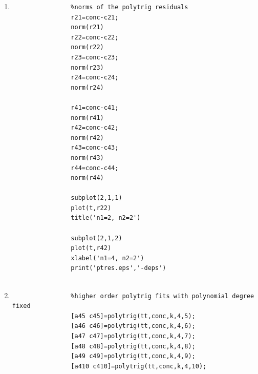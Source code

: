 \documentclass[11pt,a4paper]{article}
\begin{document}
\begin{enumerate}
\begin{enumerate}
\begin{enumerate}
\begin{verbatim}
				subplot(2,2,3)
				plot(t,conc)
				hold on
				plot(t,c13,'r')
				xlabel('n2=3')
				hold off

				subplot(2,2,4)
				plot(t,conc)
				hold on
				plot(t,c14,'r')
				xlabel('n2=4')
				hold off
				print('pt1.eps','-deps')

				subplot(2,2,1)
				plot(t,conc)
				hold on
				plot(t,c21,'r')
				title('n2=1')
				hold off

				subplot(2,2,2)
				plot(t,conc)
				hold on
				plot(t,c22,'r')
				title('n2=2')
				hold off

				subplot(2,2,3)
				plot(t,conc)
				hold on
				plot(t,c23,'r')
				xlabel('n2=3')
				hold off

				subplot(2,2,4)
				plot(t,conc)
				hold on
				plot(t,c24,'r')
				xlabel('n2=4')
				hold off
				print('pt2.eps','-deps')

				subplot(2,2,1)
				plot(t,conc)
				hold on
				plot(t,c41,'r')
				title('n2=1')
				hold off

				subplot(2,2,2)
				plot(t,conc)
				hold on
				plot(t,c42,'r')
				title('n2=2')
				hold off

				subplot(2,2,3)
				plot(t,conc)
				hold on
				plot(t,c43,'r')
				xlabel('n2=3')
				hold off


				subplot(2,2,4)
				plot(t,conc)
				hold on
				plot(t,c44,'r')
				xlabel('n2=4')
				hold off
				print('pt3.eps','-deps')
			\end{verbatim}
			
			\item[(ii)]
			\begin{verbatim}
				%norms of the polytrig residuals
				r21=conc-c21;
				norm(r21)
				r22=conc-c22;
				norm(r22)
				r23=conc-c23;
				norm(r23)
				r24=conc-c24;
				norm(r24)

				r41=conc-c41;
				norm(r41)
				r42=conc-c42;
				norm(r42)
				r43=conc-c43;
				norm(r43)
				r44=conc-c44;
				norm(r44)
				
				subplot(2,1,1)
				plot(t,r22)
				title('n1=2, n2=2')

				subplot(2,1,2)
				plot(t,r42)
				xlabel('n1=4, n2=2')
				print('ptres.eps','-deps')
				
			\end{verbatim}
			
			\item[(iii)]
			\begin{verbatim}
				%higher order polytrig fits with polynomial degree fixed
				[a45 c45]=polytrig(tt,conc,k,4,5);
				[a46 c46]=polytrig(tt,conc,k,4,6);
				[a47 c47]=polytrig(tt,conc,k,4,7);
				[a48 c48]=polytrig(tt,conc,k,4,8);
				[a49 c49]=polytrig(tt,conc,k,4,9);
				[a410 c410]=polytrig(tt,conc,k,4,10);
			

\end{verbatim}
\end{enumerate}
\end{enumerate}
\end{enumerate}
\end{document}

